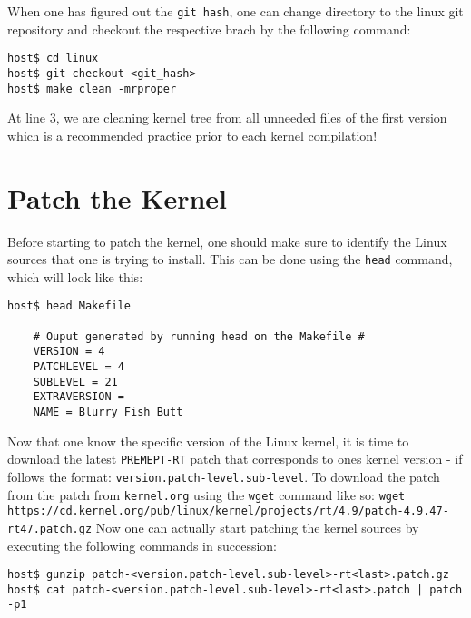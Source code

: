 \documentclass[a4paper,oneside,onecolumn]{article}
\newcommand{\code}[1]{\colorbox{codegray}{\texttt{#1}}}
\begin{document}
When one has figured out the \texttt{git hash}, one can change directory to the linux git repository and checkout the respective brach by the following command:
\begin{lstlisting}
host$ cd linux
host$ git checkout <git_hash>
host$ make clean -mrproper
\end{lstlisting}
At line 3, we are cleaning kernel tree from all unneeded files of the first version which is a recommended practice prior to each kernel compilation!

\section{Patch the Kernel}

\noindent
Before starting to patch the kernel, one should make sure to identify the Linux sources that one is trying to install. This can be done using the \code{head} command, which will look like this:
\begin{lstlisting}
host$ head Makefile

	# Ouput generated by running head on the Makefile #
	VERSION = 4
	PATCHLEVEL = 4
	SUBLEVEL = 21
	EXTRAVERSION = 
	NAME = Blurry Fish Butt
\end{lstlisting}
Now that one know the specific version of the Linux kernel, it is time to download the latest \texttt{PREMEPT-RT} patch that corresponds to ones kernel version - if follows the format: \texttt{version.patch-level.sub-level}.
\newline
To download the patch from the patch from \texttt{kernel.org} using the \code{wget} command like so: \code{wget https://cd.kernel.org/pub/linux/kernel/projects/rt/4.9/patch-4.9.47-rt47.patch.gz}
\newline
\newline
Now one can actually start patching the kernel sources by executing the following commands in succession:
\begin{lstlisting}
host$ gunzip patch-<version.patch-level.sub-level>-rt<last>.patch.gz
host$ cat patch-<version.patch-level.sub-level>-rt<last>.patch | patch -p1
\end{lstlisting}
\end{document}
